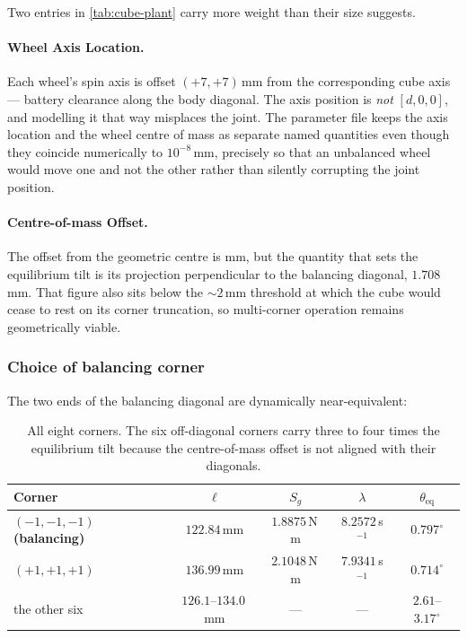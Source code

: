 Two entries in \cref{tab:cube-plant} carry more weight than their size
suggests.

\paragraph{Wheel Axis Location.} Each
wheel's spin axis is offset $(+7,+7)$\,mm from the corresponding cube axis
--- battery clearance along the body diagonal. The axis position is
\emph{not} $[d,0,0]$, and modelling it that way misplaces the joint. The
parameter file keeps the axis location and the wheel centre of mass as
separate named quantities even though they coincide numerically to
$10^{-8}$\,mm, precisely so that an unbalanced wheel would move one and not
the other rather than silently corrupting the joint position.

\paragraph{Centre-of-mass Offset.} The offset from the geometric centre is mm, but
the quantity that sets the equilibrium tilt is its projection perpendicular to
the balancing diagonal, $1.708$\,mm. That figure also sits below the
${\sim}2$\,mm threshold at which the cube would cease to rest on its corner
truncation, so multi-corner operation remains geometrically viable.

\subsubsection{Choice of balancing corner}
\label{sec:corner-choice}

The two ends of the balancing diagonal are dynamically near-equivalent:

\begin{table}[htbp]
\centering
\small
\begin{tabular}{@{}lcccc@{}}
\toprule
\textbf{Corner} & $\ell$ & $S_g$ & $\lambda$ & $\theta_{\mathrm{eq}}$\\
\midrule
$(-1,-1,-1)$ \textbf{(balancing)} & $122.84$\,mm & $1.8875$\,N\,m & $8.2572$\,s$^{-1}$ & $0.797^\circ$\\
$(+1,+1,+1)$ & $136.99$\,mm & $2.1048$\,N\,m & $7.9341$\,s$^{-1}$ & $0.714^\circ$\\
the other six & $126.1$--$134.0$\,mm & --- & --- & $2.61$--$3.17^\circ$\\
\bottomrule
\end{tabular}
\caption{All eight corners. The six off-diagonal corners carry three to four
times the equilibrium tilt because the centre-of-mass offset is not aligned
with their diagonals.}
\label{tab:corners}
\end{table}

